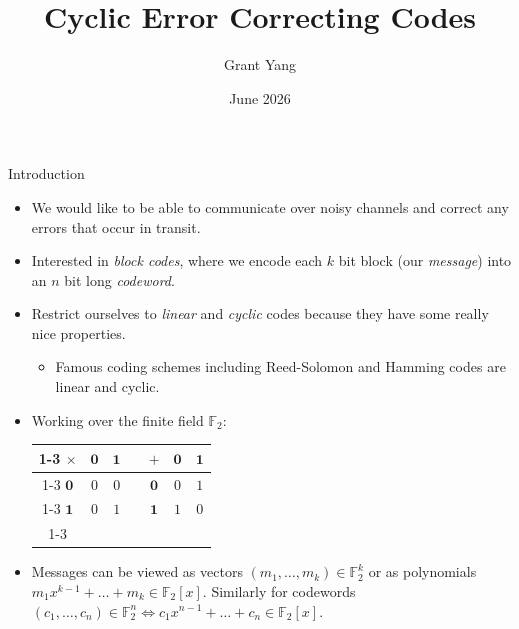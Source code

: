 \documentclass[handout]{beamer}
\title{Cyclic Error Correcting Codes}
\author{Grant Yang}
\institute{MATH 380 Spring 2026}
\date{June 2026}
\begin{document}
\begin{frame}[noframenumbering]
    \titlepage
\end{frame}

\begin{frame}{Introduction}
    \begin{itemize}
        \item  We would like to be able to communicate over noisy channels and correct any errors that occur in transit. 
        \item Interested in \emph{block codes}, where we encode each $k$ bit block (our \emph{message}) into an $n$ bit long \emph{codeword}.
        \item Restrict ourselves to \emph{linear} and \emph{cyclic} codes because they have some really nice properties.
        \begin{itemize}
            \item Famous coding schemes including Reed-Solomon and Hamming codes are linear and cyclic.
        \end{itemize}
        \item Working over the finite field $\mathbb F_2$:
        \begin{table}[H]
        \centering
        \begin{tabular}{|c||c|c| c |c||c|c|}
             \cline{1-3} \cline{5-7}
             $\times$ & $\mathbf 0$ & $\mathbf 1$ & \hspace{1em} & $+$ & $\mathbf 0$ & $\mathbf 1$  \\
             \cline{1-3} \cline{5-7}
             $\mathbf 0$ & $0$ & $0$ & \hspace{1em} & $\mathbf 0$ & $0$ & $1$ \\
             \cline{1-3} \cline{5-7}
             $\mathbf 1$ & $0$ & $1$ & \hspace{1em} & $\mathbf 1$ & $1$ & $0$ \\
             \cline{1-3} \cline{5-7}
        \end{tabular}
        \label{multf2}
        \end{table}
        \item Messages can be viewed as vectors $(m_1,\dots, m_k) \in \mathbb F_2^k$ or as polynomials $m_1 x^{k-1} + \dots+m_k \in \mathbb F_2[x]$. Similarly for codewords $(c_1,\dots,c_n)\in \mathbb F_2^n\iff c_1 x^{n-1}+\dots + c_n \in \mathbb F_2[x]$.
    \end{itemize}
   
\end{frame}
\end{document}
